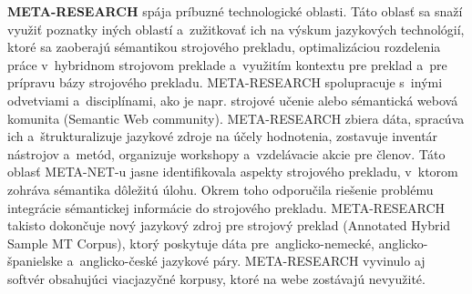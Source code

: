 {\bf META-RESEARCH} spája príbuzné technologické oblasti. Táto oblasť sa snaží využiť poznatky iných oblastí a~zužitkovať ich na výskum jazykových technológií, ktoré sa zaoberajú sémantikou strojového prekladu, optimalizáciou rozdelenia práce v~hybridnom strojovom preklade a~využitím kontextu pre preklad a~pre prípravu bázy strojového prekladu. META-RESEARCH spolupracuje s~inými odvetviami a~disciplínami, ako je napr. strojové učenie alebo sémantická webová komunita (Semantic Web community). META-RESEARCH zbiera dáta, spracúva ich a~štrukturalizuje jazykové zdroje na účely hodnotenia, zostavuje inventár nástrojov a~metód, organizuje workshopy a~vzdelávacie akcie pre členov. Táto oblasť META-NET-u jasne identifikovala aspekty strojového prekladu, v~ktorom zohráva sémantika dôležitú úlohu. Okrem toho odporučila riešenie problému integrácie sémantickej informácie do strojového prekladu. META-RESEARCH takisto dokončuje nový jazykový zdroj pre strojový preklad (Annotated Hybrid Sample MT Corpus), ktorý poskytuje dáta pre~anglicko-nemecké, anglicko-španielske a~anglicko-české jazykové páry. META-RESEARCH vyvinulo aj softvér obsahujúci viacjazyčné korpusy, ktoré na webe zostávajú nevyužité.
